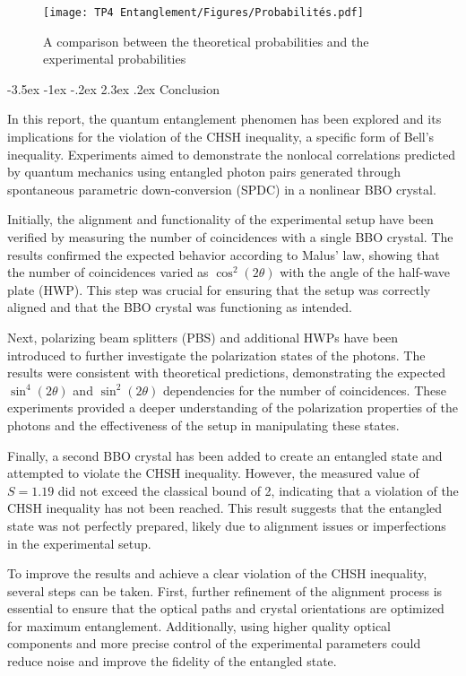 \documentclass[a4paper, 12pt,oneside]{article}
\makeatletter
\renewcommand{\section}{\@startsection {section}{1}{\z@}%
             {-3.5ex \@plus -1ex \@minus -.2ex}%
             {2.3ex \@plus.2ex}%
             {\normalfont\normalsize\bfseries}}
\makeatother
\begin{document}
\begin{figure}[H]
        \centering
        \texttt{[image: TP4 Entanglement/Figures/Probabilités.pdf]}
        \caption{A comparison between the theoretical probabilities and the experimental probabilities}
        \label{fig:Proba}
\end{figure}


\section{Conclusion}

In this report, the quantum entanglement phenomen has been explored and its implications for the violation of the CHSH inequality, a specific form of Bell's inequality. Experiments aimed to demonstrate the nonlocal correlations predicted by quantum mechanics using entangled photon pairs generated through spontaneous parametric down-conversion (SPDC) in a nonlinear BBO crystal.

Initially, the alignment and functionality of the experimental setup have been verified by measuring the number of coincidences with a single BBO crystal. The results confirmed the expected behavior according to Malus' law, showing that the number of coincidences varied as $\cos^2(2\theta)$ with the angle of the half-wave plate (HWP). This step was crucial for ensuring that the setup was correctly aligned and that the BBO crystal was functioning as intended.

Next, polarizing beam splitters (PBS) and additional HWPs have been introduced to further investigate the polarization states of the photons. The results were consistent with theoretical predictions, demonstrating the expected $\sin^4(2\theta)$ and $\sin^2(2\theta)$ dependencies for the number of coincidences. These experiments provided a deeper understanding of the polarization properties of the photons and the effectiveness of the setup in manipulating these states.

Finally, a second BBO crystal has been added to create an entangled state and attempted to violate the CHSH inequality. However, the measured value of $S = 1.19$ did not exceed the classical bound of 2, indicating that a violation of the CHSH inequality has not been reached. This result suggests that the entangled state was not perfectly prepared, likely due to alignment issues or imperfections in the experimental setup.

To improve the results and achieve a clear violation of the CHSH inequality, several steps can be taken. First, further refinement of the alignment process is essential to ensure that the optical paths and crystal orientations are optimized for maximum entanglement. Additionally, using higher quality optical components and more precise control of the experimental parameters could reduce noise and improve the fidelity of the entangled state.
\end{document}
